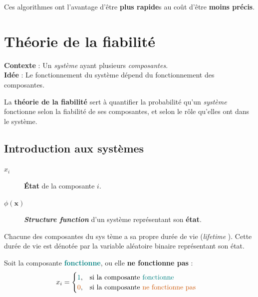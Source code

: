 \documentclass[french]{article}
\begin{document}
\begin{multicols*}{2}
\begin{definitionNOHFILLsub}
\bigskip

Ces algorithmes ont l'avantage d'être \textbf{plus rapide}s au coût d'être \textbf{moins précis}.
\end{definitionNOHFILLsub}





\newpage
\section{Théorie de la fiabilité}
\label{sec:reliability}
\begin{definitionNOHFILL}
\textbf{Contexte} : Un \textit{système} ayant plusieurs \textit{composantes}.	 \\
\textbf{Idée} : Le fonctionnement du système dépend du fonctionnement des composantes.

La \textbf{théorie de la fiabilité} sert à quantifier la probabilité qu'un \textit{système} fonctionne selon la fiabilité de ses composantes, et selon le rôle qu'elles ont dans le système.
\end{definitionNOHFILL}


\subsection{Introduction aux systèmes}
\begin{distributions}[Notation]
\begin{description}
	\item[$x_{i}$]	\textbf{État} de la composante $i$.
	\item[$\phi(\bm{x})$]	\og \textit{\textbf{Structure function}} \fg{} d'un système représentant son \textbf{état}.
\end{description}
\end{distributions}

\bigskip

\begin{definitionNOHFILLsub}
Chacune des composantes du sys tème a sa propre durée de vie (\og \textit{lifetime} \fg{}). Cette durée de vie est dénotée par la variable aléatoire binaire  représentant son état.

\bigskip

Soit la composante \textbf{\textcolor{teal}{fonctionne}}, ou elle \textbf{\textcolor{burntorange}{ne fonctionne pas}} :
\begin{align*}
	x_{i}
	&=	\begin{cases}
		\textcolor{teal}{1},	&	\text{si la composante \textcolor{teal}{fonctionne}}	\\
		\textcolor{burntorange}{0},	&	\text{si la composante \textcolor{burntorange}{ne fonctionne pas}}	
		\end{cases}
\end{align*}
\end{definitionNOHFILLsub}


\end{multicols*}
\end{document}

